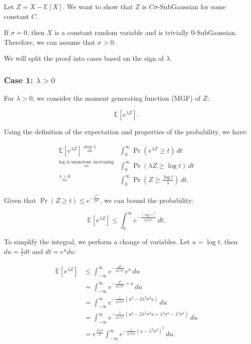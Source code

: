 \documentclass[a4 paper]{article}
\theoremstyle{boldStyle}
\theoremstyle{boldBlueStyle}
\theoremstyle{boldPurpleStyle}
\theoremstyle{boldRedStyle}
\begin{document}
Let \(Z = X - \mathbb{E}[X]\). We want to show that \(Z\) is \(C\sigma\)-SubGaussian for some constant \(C\). 

If $\sigma = 0$, then $X$ is a constant random variable and is trivially $0$-SubGaussian. Therefore, we can assume that $\sigma > 0$.

We will split the proof into cases based on the sign of \(\lambda\).

\subsubsection*{Case 1: \(\lambda > 0\)}


For \(\lambda > 0\), we consider the moment generating function (MGF) of \(Z\):

\[
\mathbb{E}[e^{\lambda Z}].
\]

Using the definition of the expectation and properties of the probability, we have:

\begin{align*}
\mathbb{E}[e^{\lambda Z}] \stackrel{\text{step 1}}{=} &\int_0^\infty \Pr(e^{\lambda Z} \geq t) \, dt \\
\stackrel{\text{log is monotone increasing}}{=} &\int_0^\infty \Pr(\lambda Z \geq \log t) \, dt \\
\stackrel{\lambda > 0}{=} &\int_0^\infty \Pr\left(Z \geq \frac{\log t}{\lambda}\right) \, dt.
\end{align*}

Given that \(\Pr(Z \geq t) \leq e^{-\frac{t^2}{2\sigma^2}}\), we can bound the probability:

\[
\mathbb{E}[e^{\lambda Z}] \leq \int_0^\infty e^{-\frac{(\log t)^2}{2\lambda^2 \sigma^2}} \, dt.
\]

To simplify the integral, we perform a change of variables. Let \(u = \log t\), then \(du = \frac{1}{t} dt\) and \(dt = e^u du\):

\begin{align*}
\mathbb{E}[e^{\lambda Z}] &\leq \int_{-\infty}^{\infty} e^{-\frac{u^2}{2\lambda^2 \sigma^2}} e^u \, du \\
&= \int_{-\infty}^{\infty} e^{-\frac{u^2}{2\lambda^2 \sigma^2} + u} \, du \\
&= \int_{-\infty}^{\infty} e^{-\frac{1}{2\lambda^2 \sigma^2}(u^2 - 2\lambda^2 \sigma^2 u)} \, du \\
&= \int_{-\infty}^{\infty} e^{-\frac{1}{2\lambda^2 \sigma^2}\left(u^2 - 2\lambda^2 \sigma^2 u + \lambda^4 \sigma^4 - \lambda^4 \sigma^4\right)} \, du \\
&= e^{\frac{\lambda^2 \sigma^2}{2}} \int_{-\infty}^{\infty} e^{-\frac{1}{2\lambda^2 \sigma^2}(u - \lambda^2 \sigma^2)^2} \, du.
\end{align*}
\end{document}
